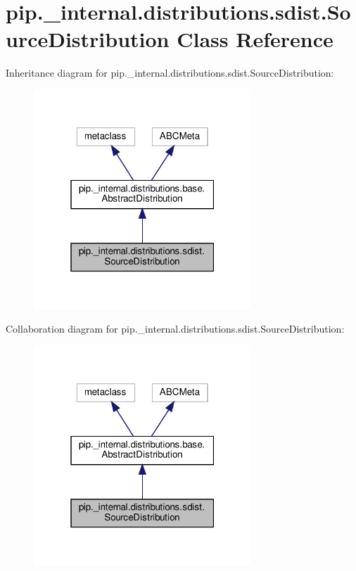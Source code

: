 \hypertarget{classpip_1_1__internal_1_1distributions_1_1sdist_1_1SourceDistribution}{}\section{pip.\+\_\+internal.\+distributions.\+sdist.\+Source\+Distribution Class Reference}
\label{classpip_1_1__internal_1_1distributions_1_1sdist_1_1SourceDistribution}


Inheritance diagram for pip.\+\_\+internal.\+distributions.\+sdist.\+Source\+Distribution\+:
\nopagebreak
\begin{figure}[H]
\begin{center}
\leavevmode
\includegraphics[width=232pt]{classpip_1_1__internal_1_1distributions_1_1sdist_1_1SourceDistribution__inherit__graph}
\end{center}
\end{figure}


Collaboration diagram for pip.\+\_\+internal.\+distributions.\+sdist.\+Source\+Distribution\+:
\nopagebreak
\begin{figure}[H]
\begin{center}
\leavevmode
\includegraphics[width=232pt]{classpip_1_1__internal_1_1distributions_1_1sdist_1_1SourceDistribution__coll__graph}
\end{center}
\end{figure}
